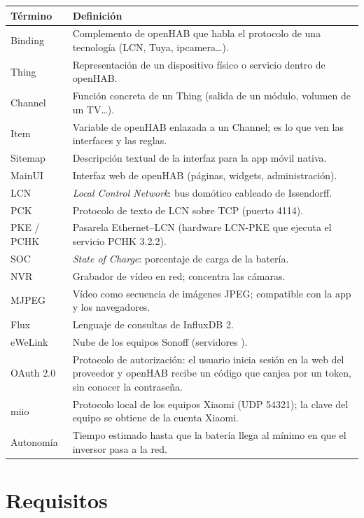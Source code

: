 \documentclass[11pt,a4paper]{report}
\newcommand{\code}[1]{\texttt{\detokenize{#1}}}
\begin{document}
\begin{longtable}{@{}p{3.2cm}p{11.8cm}@{}}
\toprule
\textbf{Término} & \textbf{Definición}\\\midrule\endhead
Binding & Complemento de openHAB que habla el protocolo de una tecnología (LCN, Tuya, ipcamera\ldots).\\
Thing & Representación de un dispositivo físico o servicio dentro de openHAB.\\
Channel & Función concreta de un Thing (salida de un módulo, volumen de un TV\ldots).\\
Item & Variable de openHAB enlazada a un Channel; es lo que ven las interfaces y las reglas.\\
Sitemap & Descripción textual de la interfaz para la app móvil nativa.\\
MainUI & Interfaz web de openHAB (páginas, widgets, administración).\\
LCN & \emph{Local Control Network}: bus domótico cableado de Issendorff.\\
PCK & Protocolo de texto de LCN sobre TCP (puerto 4114).\\
PKE / PCHK & Pasarela Ethernet–LCN (hardware LCN-PKE que ejecuta el servicio PCHK 3.2.2).\\
SOC & \emph{State of Charge}: porcentaje de carga de la batería.\\
NVR & Grabador de vídeo en red; concentra las cámaras.\\
MJPEG & Vídeo como secuencia de imágenes JPEG; compatible con la app y los navegadores.\\
Flux & Lenguaje de consultas de InfluxDB 2.\\
eWeLink & Nube de los equipos Sonoff (servidores \code{*-apia.coolkit.cc}).\\
OAuth 2.0 & Protocolo de autorización: el usuario inicia sesión en la web del proveedor y openHAB recibe
            un código que canjea por un token, sin conocer la contraseña.\\
miio & Protocolo local de los equipos Xiaomi (UDP 54321); la clave del equipo se obtiene de la cuenta Xiaomi.\\
Autonomía & Tiempo estimado hasta que la batería llega al mínimo en que el inversor pasa a la red.\\
\bottomrule
\end{longtable}

\chapter{Requisitos}
\end{document}
